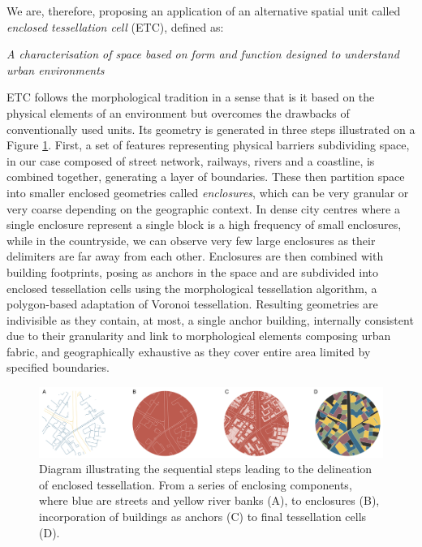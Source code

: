 We are, therefore, proposing an application of an alternative spatial unit called \textit{enclosed
tessellation cell} (ETC), defined as:

\textit{A characterisation of space based on form and function designed to understand urban
environments}


ETC follows the morphological tradition in a sense that is it
based on the physical elements of an environment but overcomes the drawbacks of
conventionally used units. Its geometry is generated in three steps illustrated on a
Figure \ref{fig:et_diagram}. First, a set of features representing physical barriers
subdividing space, in our case composed of street network, railways, rivers and a
coastline, is combined together, generating a layer of boundaries. These then partition space
into smaller enclosed geometries called \textit{enclosures}, which can be very granular
or very coarse depending on the geographic context. In dense city centres where a single
enclosure represent a single block is a high frequency of small enclosures, while in the
countryside, we can observe very few large enclosures as their delimiters are far away
from each other. Enclosures are then combined with building footprints, posing as
anchors in the space and are subdivided into enclosed tessellation cells using the
morphological tessellation algorithm\cite{fleischmann2020}, a polygon-based adaptation of Voronoi
tessellation. Resulting geometries are indivisible as they contain, at most, a single
anchor building, internally consistent due to their granularity and link to morphological
elements composing urban fabric, and geographically exhaustive as they cover entire area
limited by specified boundaries.

\begin{figure}
    \includegraphics[width=\linewidth]{fig/et_diagram.pdf}
    \caption{Diagram illustrating the sequential steps leading to the delineation of
    enclosed tessellation. From a series of enclosing components, where blue are streets
    and yellow river banks (A), to enclosures (B), incorporation of buildings as anchors
    (C) to final tessellation cells (D).}
    \label{fig:et_diagram}
\end{figure}

